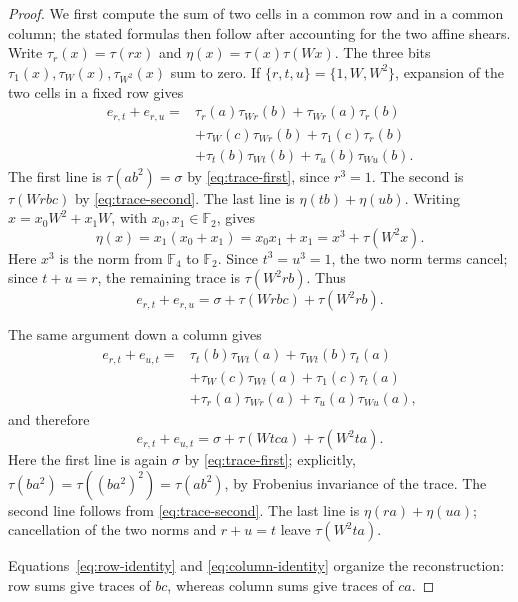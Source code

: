 \documentclass[11pt]{article}
\newcommand{\F}{\mathbb F}
\begin{document}
\begin{proof}
We first compute the sum of two cells in a common row and in a common
column; the stated formulas then follow after accounting for the two affine
shears.
Write \(\tau_r(x)=\tau(rx)\) and
\(\eta(x)=\tau(x)\tau(Wx)\).  The three bits
\(\tau_1(x),\tau_W(x),\tau_{W^2}(x)\) sum to zero.  If
\(\{r,t,u\}=\{1,W,W^2\}\), expansion of the two cells in a fixed row
gives
\begin{equation}\label{eq:row-expansion}
\begin{aligned}
 e_{r,t}+e_{r,u}={}&
  \tau_r(a)\tau_{Wr}(b)+\tau_{Wr}(a)\tau_r(b)\\
 &+\tau_W(c)\tau_{Wr}(b)+\tau_1(c)\tau_r(b)\\
 &+\tau_t(b)\tau_{Wt}(b)+\tau_u(b)\tau_{Wu}(b).
\end{aligned}
\end{equation}
The first line is \(\tau(ab^2)=\sigma\) by
\eqref{eq:trace-first}, since \(r^3=1\).  The second is
\(\tau(Wrbc)\) by \eqref{eq:trace-second}.  The last line is
\(\eta(tb)+\eta(ub)\).  Writing \(x=x_0W^2+x_1W\), with
\(x_0,x_1\in\F_2\), gives
\[
\eta(x)=x_1(x_0+x_1)=x_0x_1+x_1
        =x^3+\tau(W^2x).
\]
Here \(x^3\) is the norm from \(\F_4\) to \(\F_2\).
Since \(t^3=u^3=1\), the two norm terms cancel; since \(t+u=r\),
the remaining trace is \(\tau(W^2rb)\).  Thus
\begin{equation}\label{eq:row-identity}
 e_{r,t}+e_{r,u}
 =\sigma+\tau(Wrbc)+\tau(W^2rb).
\end{equation}

The same argument down a column gives
\begin{align*}
 e_{r,t}+e_{u,t}={}&
  \tau_t(b)\tau_{Wt}(a)+\tau_{Wt}(b)\tau_t(a)\\
 &+\tau_W(c)\tau_{Wt}(a)+\tau_1(c)\tau_t(a)\\
 &+\tau_r(a)\tau_{Wr}(a)+\tau_u(a)\tau_{Wu}(a),
\end{align*}
and therefore
\begin{equation}\label{eq:column-identity}
 e_{r,t}+e_{u,t}
 =\sigma+\tau(Wtca)+\tau(W^2ta).
\end{equation}
Here the first line is again \(\sigma\) by
\eqref{eq:trace-first}; explicitly,
\(\tau(ba^2)=\tau((ba^2)^2)=\tau(ab^2)\), by Frobenius invariance of
the trace.  The second line follows from \eqref{eq:trace-second}.  The last
line is
\(\eta(ra)+\eta(ua)\); cancellation of the two norms and
\(r+u=t\) leave \(\tau(W^2ta)\).

Equations~\eqref{eq:row-identity} and \eqref{eq:column-identity} organize
the reconstruction: row sums give traces of \(bc\), whereas column sums
give traces of \(ca\).


\end{proof}
\end{document}
